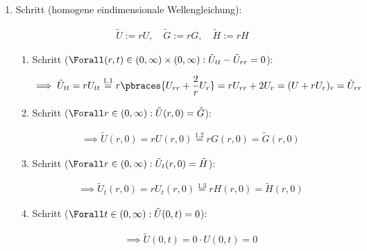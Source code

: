 \begin{solution}
\begin{enumerate}[label = \arabic*.]
\begin{enumerate}[label = 1.\arabic*.]
    \end{enumerate}

    \item Schritt (homogene eindimensionale Wellengleichung):

    \begin{align*}
        \tilde U := r U,
        \quad
        \tilde G := r G,
        \quad
        \tilde H := r H
    \end{align*}

    \begin{enumerate}[label = 2.\arabic*.]

        \item Schritt ($\Forall (r, t) \in (0, \infty) \times (0, \infty): \tilde U_{tt} - \tilde U_{rr} = 0$):

        \begin{align*}
            \implies
            \tilde U_{tt}
            =
            r U_{tt}
            \stackrel
            {
                \mathrm{1.1}
            }{=}
            r \pbraces{U_{rr} + \frac{2}{r} U_r}
            =
            r U_{rr} + 2 U_r
            =
            (U + r U_r)_r
            =
            \tilde U_{rr}
        \end{align*}

        \item Schritt ($\Forall r \in (0, \infty): \tilde U(r, 0) = \tilde G$):

        \begin{align*}
            \implies
            \tilde U(r, 0)
            =
            r U(r, 0)
            \stackrel
            {
                \mathrm{1.2}
            }{=}
            r G(r, 0)
            =
            \tilde G(r, 0)
        \end{align*}

        \item Schritt ($\Forall r \in (0, \infty): \tilde U_t(r, 0) = \tilde H$):

        \begin{align*}
            \implies
            \tilde U_t(r, 0)
            =
            r U_t(r, 0)
            \stackrel
            {
                \mathrm{1.3}
            }{=}
            r H(r, 0)
            =
            \tilde H(r, 0)
        \end{align*}

        \item Schritt ($\Forall t \in (0, \infty): \tilde U(0, t) = 0$):

        \begin{align*}
            \implies
            \tilde U(0, t)
            =
            0 \cdot U(0, t)
            =
            0
        \end{align*}


\end{enumerate}
\end{enumerate}
\end{solution}
